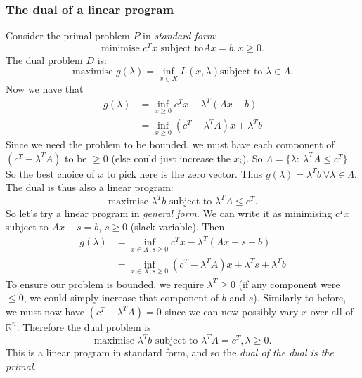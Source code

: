 \documentclass[a4paper]{scrartcl}
\begin{document}
\subsubsection{The dual of a linear program}
Consider the primal problem $P$ in \emph{standard form}: 
\[\text{minimise } c^Tx \text{ subject to} Ax=b, x \geq 0.\]
The dual problem $D$ is: 
\[\text{maximise } g (\lambda)=\inf_{x \in X} L (x, \lambda) \text{subject to } \lambda \in \Lambda.\]
Now we have that 
\begin{equation*}
	\begin{split}
		g (\lambda)&=\inf_{x \geq 0} c^Tx - \lambda^T (Ax-b)\\
		&=\inf_{x \geq 0} (c^T - \lambda^TA)x+\lambda^T b
	\end{split}
\end{equation*}
Since we need the problem to be bounded, we must have each component of $(c^T-\lambda^TA)$ to be $\geq 0$ (else could just increase the $x_i$). So $\Lambda=\{\lambda: \ \lambda^TA \leq c^T\}$. So the best choice of $x$ to pick here is the zero vector. Thus $g (\lambda)=\lambda^T b \ \forall \lambda \in \Lambda$.
The dual is thus also a linear program: 
\[\text{maximise } \lambda^Tb \text{ subject to } \lambda^TA \leq c^T.\]
So let's try a linear program in \emph{general form}.
We can write it as minimising $c^Tx$ subject to $Ax-s=b$, $s \geq 0$ (slack variable). Then
\begin{equation*}
	\begin{split}
		g (\lambda)&=\inf_{x \in X,s \geq 0} c^Tx - \lambda^T (Ax-s-b)\\
		&=\inf_{x \in X, s \geq 0} (c^T - \lambda^TA)x+\lambda^T s+\lambda^T b
	\end{split}
\end{equation*}
To ensure our problem is bounded, we require $\lambda^T \geq 0$ (if any component were $\leq 0$, we could simply increase that component of $b$ and $s$). Similarly to before, we must now have $(c^T-\lambda^T A)=0$ since we can now possibly vary $x$ over all of $\mathbb{R}^{n} $. Therefore the dual problem is 
\[\text{maximise } \lambda^Tb \text{ subject to } \lambda^TA= c^T, \lambda \geq 0.\]
This is a linear program in standard form, and so the \emph{dual of the dual is the primal}.
\end{document}
